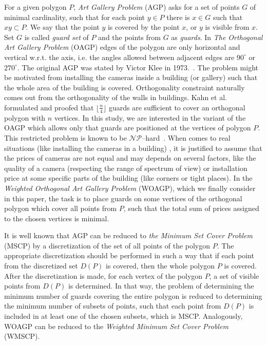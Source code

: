 \documentclass[runningheads,a4paper]{elsarticle}
\begin{document}
	For a given polygon $P$, \emph{Art Gallery Problem} (AGP) asks for a set of points $G$ of minimal cardinality,  such that for each point $y \in P$ there is $x \in G$ such that $xy \subset P$. We say that the point $y$ is covered by the point $x$, or $y$ is visible from $x$. Set $G$ is called \emph{guard set} of $P$ and the points from $G$ as \emph{guards}. In \emph{The Orthogonal Art Gallery Problem} (OAGP) edges of the polygon are only horizontal and vertical w.r.t. the axis, i.e.  the angles allowed between adjacent edges are  $90^{\circ}$ or $270^{\circ}$. The original AGP was stated by Victor  Klee in 1973.~\cite{o1987art}.  The problem might be motivated from installing the cameras inside a building (or gallery) such that the whole area of the building is covered. Orthogonality constraint naturally comes out from the orthogonality of the walls in buildings. Kahn et al.~\cite{kahn1983traditional} formulated and proofed that 	$\lfloor \frac{n}{4} \rfloor$ guards are  sufficient to cover an orthogonal polygon with $n$ vertices.      In this study, we are interested in the variant of the OAGP which allows only that guards are positioned at the vertices of polygon $P$. This restricted problem is known to be $\mathcal{NP}$--hard~\cite{schuchardt1995two,katz2008guarding}.  When comes to real situations (like installing the cameras in a building) , it is justified to assume that the prices of cameras are not equal and may depends on several factors, like the quality of a camera   (respecting the range of spectrum of view)  or installation price at some specific parts of the building (like corners or tight places).  In the \emph{Weighted Orthogonal Art Gallery Problem} (WOAGP), which we finally consider in this paper, the task is to place guards on some vertices of the orthogonal polygon which cover all points from $P$, such that the total sum of prices assigned to the chosen vertices is minimal.
	
	It is well known that AGP can be reduced to \emph{the Minimum Set Cover Problem} (MSCP) by a discretization of the set of all points of the polygon $P$. The appropriate discretization should be performed in such a way that if each point from the discretized set $D(P)$ is covered, then the whole polygon $P$ is covered. After the discretization is made, for each vertex of the polygon $P$, a set of visible points from $D(P)$ is determined. In that way, the problem of determining the minimum number of guards covering the entire polygon is reduced to determining the minimum number of subsets of points, such that each point from $D(P)$ is included in at least one of the chosen subsets, which is MSCP. Analogously, WOAGP can be reduced to the \emph{Weighted Minimum Set Cover Problem} (WMSCP).
	
\end{document}
